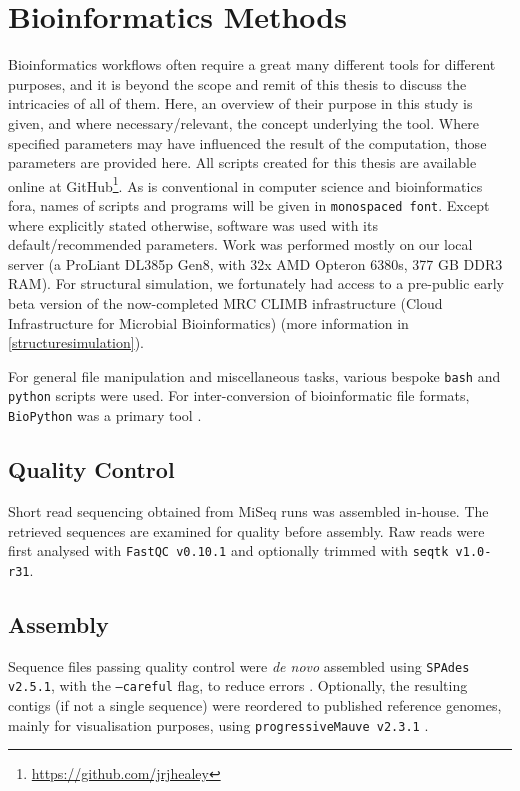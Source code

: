 \section{Bioinformatics Methods}
Bioinformatics workflows often require a great many different tools for different purposes, and it is beyond the scope and remit of this thesis to discuss the intricacies of all of them. Here, an overview of their purpose in this study is given, and where necessary/relevant, the concept underlying the tool. Where specified parameters may have influenced the result of the computation, those parameters are provided here. All scripts created for this thesis are available online at GitHub\footnote{\url{https://github.com/jrjhealey}}. As is conventional in computer science and bioinformatics fora, names of scripts and programs will be given in \texttt{monospaced font}. Except where explicitly stated otherwise, software was used with its default/recommended parameters. Work was performed mostly on our local server (a ProLiant DL385p Gen8, with 32x AMD Opteron 6380s, 377 GB DDR3 RAM). For structural simulation, we fortunately had access to a pre-public early beta version of the now-completed MRC CLIMB infrastructure (Cloud Infrastructure for Microbial Bioinformatics)\citep{Connor2016a} (more information in \vref{structuresimulation}).

For general file manipulation and miscellaneous tasks, various bespoke \texttt{bash} and \texttt{python} scripts were used. For inter-conversion of bioinformatic file formats, \texttt{BioPython} was a primary tool \citep{Cock2009}.

\subsection{Quality Control}
Short read sequencing obtained from MiSeq runs was assembled in-house. The retrieved sequences are examined for quality before assembly. Raw reads were first analysed with \texttt{FastQC v0.10.1} and optionally trimmed with \texttt{seqtk v1.0-r31}.

\subsection{Assembly}\label{assembly}
Sequence files passing quality control were \emph{de novo} assembled using \texttt{SPAdes v2.5.1}, with the \texttt{--careful} flag, to reduce errors \citep{Bankevich2012}.  Optionally, the resulting contigs (if not a single sequence) were reordered to published reference genomes, mainly for visualisation purposes, using \texttt{progressiveMauve v2.3.1} \citep{Darling2010}.

